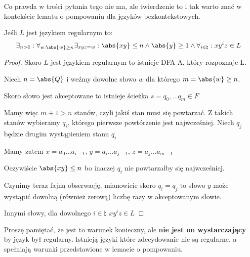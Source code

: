 Co prawda w treści pytania tego nie ma, ale twierdzenie to i tak warto znać w kontekście lematu o pompowaniu dla języków bezkontekstowych.

\begin{lemma}
    Jeśli \( L \) jest językiem regularnym to:
    \[
        \exists_{n > 0} : \forall_{w : \abs{w} \geq n} \exists_{xyz = w} : \abs{xy} \leq n \land \abs{y} \geq 1 \land \forall_{i \in \natural} : xy^iz \in L
    \]
\end{lemma}
\begin{proof}
    Skoro \( L \) jest językiem regularnym to istnieje DFA A, który rozpoznaje L.
    
    Niech \( n = \abs{Q} \) i weźmy dowolne słowo \( w \) dla którego \( m = \abs{w} \geq n \).
    
    Skoro słowo jest akceptowane to istnieje ścieżka \( s = q_0, \dots q_m \in F \)
    
    Mamy więc \( m + 1 > n \) stanów, czyli jakiś stan musi się powtarzać. 
    Z takich stanów wybieramy \( q_i \), którego pierwsze powtórzenie jest najwcześniej. Niech \( q_j \) będzie drugim wystąpieniem stanu \( q_i \)
    
    Mamy zatem \( x = a_0\dots a_{i-1} \), \( y = a_i\dots a_{j-1} \), \( z = a_j \dots a_{m-1} \)
    
    Oczywiście \( \abs{xy} \leq n \) bo inaczej \( q_i \) nie powtarzałby się najwcześniej.
    
    Czynimy teraz fajną obserwację, mianowicie skoro  \( q_i = q_j \) to słowo \( y \) może wystąpić dowolną (również zerową) liczbę razy w akceptowanym słowie.
    
    Innymi słowy, dla dowolnego \( i \in \natural \) \( xy^iz \in L \)
\end{proof}

Proszę pamiętać, że jest to warunek konieczny, ale \textbf{nie jest on wystarczający} by język był regularny. Istnieją języki które zdecydowanie nie są regularne, a spełniają warunki przedstawione w lemacie o pompowaniu. 